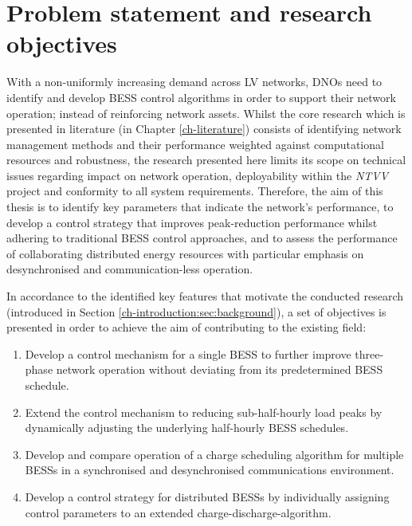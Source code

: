 \section{Problem statement and research objectives}
\label{ch-introduction:sec:problem-statement}

With a non-uniformly increasing demand across LV networks, DNOs need to identify and develop BESS control algorithms in order to support their network operation; instead of reinforcing network assets.
Whilst the core research which is presented in literature (in Chapter \ref{ch-literature}) consists of identifying network management methods and their performance weighted against computational resources and robustness, the research presented here limits its scope on technical issues regarding impact on network operation, deployability within the \textit{NTVV} project and conformity to all system requirements.
Therefore, the aim of this thesis is to identify key parameters that indicate the network's performance, to develop a control strategy that improves peak-reduction performance whilst adhering to traditional BESS control approaches, and to assess the performance of collaborating distributed energy resources with particular emphasis on desynchronised and communication-less operation.

In accordance to the identified key features that motivate the conducted research (introduced in Section \ref{ch-introduction:sec:background}), a set of objectives is presented in order to achieve the aim of contributing to the existing field:

\begin{enumerate}
	\item Develop a control mechanism for a single BESS to further improve three-phase network operation without deviating from its predetermined BESS schedule.
	\item Extend the control mechanism to reducing sub-half-hourly load peaks by dynamically adjusting the underlying half-hourly BESS schedules.
	\item Develop and compare operation of a charge scheduling algorithm for multiple BESSs in a synchronised and desynchronised communications environment.
	\item Develop a control strategy for distributed BESSs by individually assigning control parameters to an extended charge-discharge-algorithm.
\end{enumerate}


